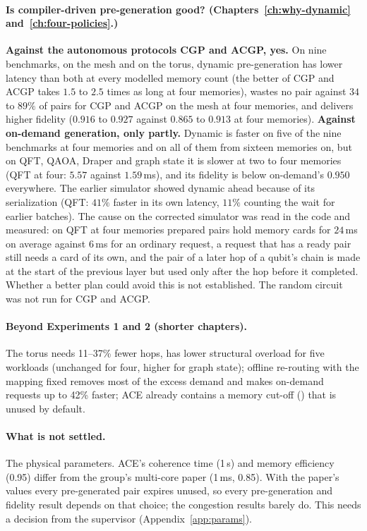 \paragraph{Is compiler-driven pre-generation good? (Chapters~\ref{ch:why-dynamic} and~\ref{ch:four-policies}.)} \textbf{Against the autonomous protocols CGP and ACGP, yes.} On nine benchmarks, on the mesh and on the torus, dynamic pre-generation has lower latency than both
  at every modelled memory count (the better of CGP and ACGP takes $1.5$ to $2.5$ times as long at four memories), wastes no pair against $34$ to $89\%$ of pairs for CGP and ACGP on the mesh at four memories, and delivers higher fidelity ($0.916$ to $0.927$ against $0.865$ to $0.913$ at four memories).
  \textbf{Against on-demand generation, only partly.} Dynamic is faster on five of the nine benchmarks at four memories and on all of them from sixteen memories on, but on QFT, QAOA, Draper and graph state it is slower at two to four memories (QFT at four: $5.57$ against $1.59$\,ms), and its fidelity is below on-demand's $0.950$ everywhere.
  The earlier simulator showed dynamic ahead because of its serialization (QFT: $41\%$ faster in its own latency, $11\%$ counting the wait for earlier batches). The cause on the corrected simulator was read in the code and measured: on QFT at four memories prepared pairs hold memory cards for $24$\,ms on average
  against $6$\,ms for an ordinary request, a request that has a ready pair still needs a card of its own, and the pair of a later hop of a qubit's chain is made at the start of the previous layer but used only after the hop before it completed. Whether a better plan could avoid this is not established.
  The random circuit was not run for CGP and ACGP.

\paragraph{Beyond Experiments 1 and 2 (shorter chapters).} The torus needs 11--37\% fewer hops, has lower structural overload for five workloads (unchanged for four, higher for graph state); offline re-routing with the mapping fixed removes most of the excess demand and makes on-demand requests up to 42\% faster; ACE already contains a memory cut-off
() that is unused by default.

\paragraph{What is not settled.} The physical parameters. ACE's coherence time (1\,s) and memory efficiency (0.95) differ from the group's multi-core paper (1\,ms, 0.85). With the paper's values every pre-generated pair expires unused, so every pre-generation
and fidelity result depends on that choice; the congestion results barely do. This needs a decision from the supervisor (Appendix~\ref{app:params}).

